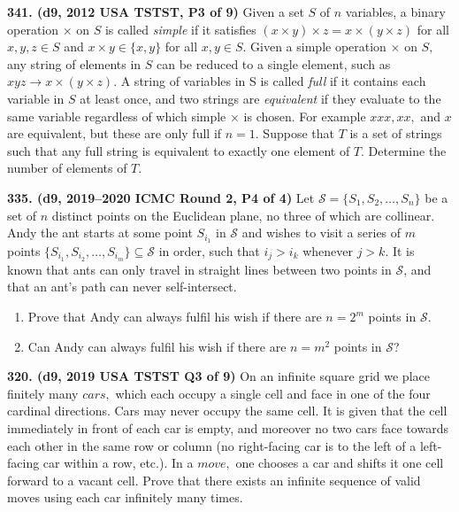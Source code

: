 \documentclass{article}
\begin{document}
\textbf{341. (\color{red}d9\color{black}, 2012 USA TSTST, P3 of 9)} Given a set $S$ of $n$ variables, a binary operation $\times$ on $S$ is called \textit{simple} if it satisfies $(x \times y) \times z = x \times (y \times z)$ for all $x, y, z \in S$ and $x \times y \in \{x, y\}$ for all $x, y \in S.$ Given a simple operation $\times$ on $S,$ any string of elements in $S$ can be reduced to a single element, such as $xyz \to x \times (y \times z).$ A string of variables in S is called \textit{full} if it contains each variable in $S$ at least once, and two strings are \textit{equivalent} if they evaluate to the same variable regardless of which simple $\times$ is chosen. For example $xxx, xx,$ and $x$ are equivalent, but these are only full if $n = 1.$ Suppose that $T$ is a set of strings such that any full string is equivalent to exactly one element of $T.$ Determine the number of elements of $T.$

\textbf{335. (\color{red}d9\color{black}, 2019–2020 ICMC Round 2, P4 of 4)} Let $ \mathcal{S} = \{S_1, S_2, \dots, S_n\} $ be a set of $ n $ distinct points on the Euclidean plane, no three of which are collinear. Andy the ant starts at some point $ S_{i_1} $ in $ \mathcal{S} $ and wishes to visit a series of $ m $ points $ \{S_{i_1}, S_{i_2}, \dots, S_{i_m}\} \subseteq \mathcal{S} $ in order, such that $ i_j > i_k $ whenever $ j > k $. It is known that ants can only travel in straight lines between two points in $ \mathcal{S} $, and that an ant's path can never self-intersect.
\renewcommand{\labelenumi}{\theenumi}
\renewcommand{\theenumi}{\roman{enumi})}
\begin{enumerate}
        \item Prove that Andy can always fulfil his wish if there are $ n = 2^m $ points in $ \mathcal{S} $.
        \item Can Andy can always fulfil his wish if there are $ n = m^2 $ points in $ \mathcal{S} $?
\end{enumerate}

\textbf{320. (\color{red}d9\color{black}, 2019 USA TSTST Q3 of 9)} On an infinite square grid we place finitely many $\textit{cars},$ which each occupy a single cell and face in one of the four cardinal directions. Cars may never occupy the same cell. It is given that the cell immediately in front of each car is empty, and moreover no two cars face towards each other in the same row or column (no right-facing car is to the left of a left-facing car within a row, etc.). In a $\textit{move},$ one chooses a car and shifts it one cell forward to a vacant cell. Prove that there exists an infinite sequence of valid moves using each car infinitely many times.
\end{document}
